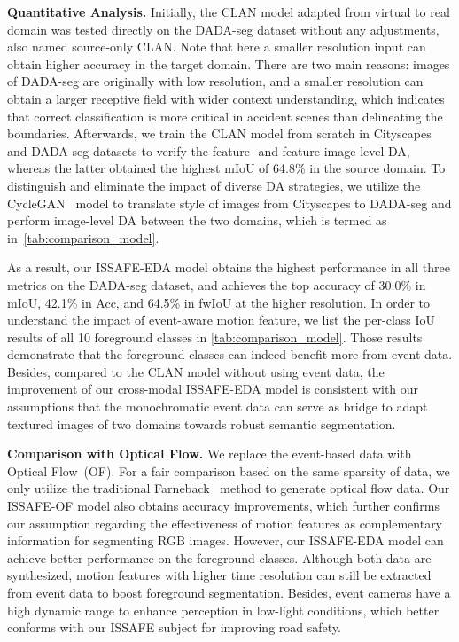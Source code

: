 \documentclass[letterpaper, 10 pt, conference]{ieeeconf}
\begin{document}
\textbf{Quantitative Analysis.} Initially, the CLAN model adapted from virtual to real domain was tested directly on the DADA-seg dataset without any adjustments, also named source-only CLAN. 
Note that here a smaller resolution input can obtain higher accuracy in the target domain. There are two main reasons: images of DADA-seg are originally with low resolution, and a smaller resolution can obtain a larger receptive field with wider context understanding, which indicates that correct classification is more critical in accident scenes than delineating the boundaries. Afterwards, we train the CLAN model from scratch in Cityscapes and DADA-seg datasets to verify the feature- and feature-image-level DA, whereas the latter obtained the highest mIoU of 64.8\% in the source domain. To distinguish and eliminate the impact of diverse DA strategies, we utilize the CycleGAN~\cite{zhu2017cycleGAN} model to translate style of images from Cityscapes to DADA-seg and perform image-level DA between the two domains, which is termed as  in~\cref{tab:comparison_model}. 


As a result, our ISSAFE-EDA model obtains the highest performance in all three metrics on the DADA-seg dataset, and achieves the top accuracy of 30.0\% in mIoU, 42.1\% in Acc, and 64.5\% in fwIoU at the higher resolution. 
In order to understand the impact of event-aware motion feature, we list the per-class IoU results of all 10 foreground classes in \cref{tab:comparison_model}. Those results demonstrate that the foreground classes can indeed benefit more from event data. Besides, compared to the CLAN model without using event data, the improvement of our cross-modal ISSAFE-EDA model is consistent with our assumptions that the monochromatic event data can serve as bridge to adapt textured images of two domains towards robust semantic segmentation. 

\textbf{Comparison with Optical Flow.} We replace the event-based data with Optical Flow~(OF). For a fair comparison based on the same sparsity of data, we only utilize the traditional Farneback~\cite{farneback2003DOF} method to generate optical flow data. Our ISSAFE-OF model also obtains accuracy improvements, which further confirms our assumption regarding the effectiveness of motion features as complementary information for segmenting RGB images. However, our ISSAFE-EDA model can achieve better performance on the foreground classes.
Although both data are synthesized, motion features with higher time resolution can still be extracted from event data to boost foreground segmentation. Besides, event cameras have a high dynamic range to enhance perception in low-light conditions, which better conforms with our ISSAFE subject for improving road safety.
\end{document}

